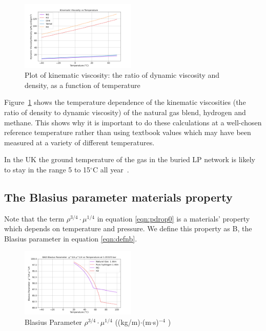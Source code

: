 \documentclass[5p]{elsarticle} %
\begin{document}
\begin{figure}[htb]
\centering
\includegraphics[width=0.49\textwidth]{peng_re.png}
\caption{Plot of kinematic viscosity: the ratio of dynamic viscosity and density, as a function of temperature}
\label{fig:peng_re}
\end{figure}

Figure~\ref{fig:peng_re} shows the temperature dependence of the kinematic viscosities (the ratio of density to dynamic viscosity) of  the natural gas blend, hydrogen and methane. This shows why it is important to do these calculations at a well-chosen reference temperature rather than using textbook values which may have been measured at a variety of different temperatures.

In the UK the ground temperature of the gas in the buried LP network is likely to stay in the range 5 to 15$^\circ$C all year~\citep{MacKay2008}.



\subsection{The Blasius parameter materials property}
\label{sec:blasiusparam}
Note that the term $\rho^{3/4} \cdot \mu^{1/4}$ in equation \ref{eqn:pdrop0} is a materials' property which depends on temperature and pressure. We define this property as B, the Blasius parameter in equation \ref{eqn:defnb}.

\begin{figure}[htb]
\centering
\includegraphics[width=0.49\textwidth]{peng_bf.png}
\caption{Blasius Parameter  $\rho^{3/4} \cdot \mu^{1/4}$ ((kg/m)$\cdot$(m$\cdot$s)$^{-4}$ )}
\label{fig:blasiusparam0}
\end{figure}
\end{document}
